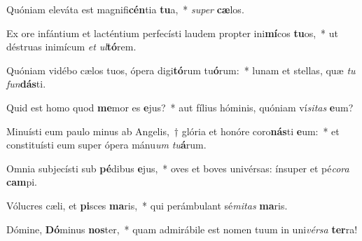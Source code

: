 \item Quóniam eleváta est magnifi\textbf{cén}tia \textbf{tu}a,~* \textit{su}\textit{per} \textbf{cæ}los.
\item Ex ore infántium et lacténtium perfecísti laudem propter ini\textbf{mí}cos \textbf{tu}os,~* ut déstruas inimícum \textit{et} \textit{ul}\textbf{tó}rem.
\item Quóniam vidébo cælos tuos, ópera digi\textbf{tó}rum tu\textbf{ó}rum:~* lunam et stellas, quæ \textit{tu} \textit{fun}\textbf{dás}ti.
\item Quid est homo quod \textbf{me}mor es \textbf{e}jus?~* aut fílius hóminis, quóniam ví\textit{si}\textit{tas} \textbf{e}um?
\item Minuísti eum paulo minus ab Angelis,~† glória et honóre coro\textbf{nás}ti \textbf{e}um:~* et constituísti eum super ópera mánu\textit{um} \textit{tu}\textbf{á}rum.
\item Omnia subjecísti sub \textbf{pé}dibus \textbf{e}jus,~* oves et boves univérsas: ínsuper et pé\textit{co}\textit{ra} \textbf{cam}pi.
\item Vólucres cæli, et \textbf{pi}sces \textbf{ma}ris,~* qui perámbulant sé\textit{mi}\textit{tas} \textbf{ma}ris.
\item Dómine, \textbf{Dó}minus \textbf{nos}ter,~* quam admirábile est nomen tuum in uni\textit{vér}\textit{sa} \textbf{ter}ra!
